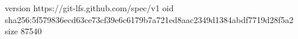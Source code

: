 version https://git-lfs.github.com/spec/v1
oid sha256:5f579836ecd63ce73cf39e6c6179b7a721ed8aac2349d1384abdf7719d28f5a2
size 87540
